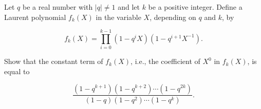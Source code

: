 Let $q$ be a real number with $|q| \ne 1$ and let $k$ be a positive integer.
Define a Laurent polynomial $f_k (X)$ in the variable $X$, depending on $q$ and
$k$, by

$$ f_k (X) = \prod_{i=0}^{k-1} (1 - q^i X)(1 - q^{i+1} X^{-1}). $$

Show that the constant term of $f_k (X)$, i.e., the coefficient of $X^0$ in
$f_k (X)$, is equal to

$$ \frac{(1 - q^{k+1})(1 - q^{k+2}) \cdots (1 - q^{2k})}{(1 - q)(1 - q^2) \cdots (1 - q^k)}. $$
